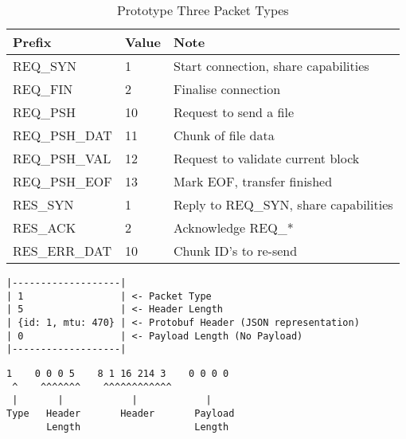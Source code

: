 \begin{table}[h!]
	\caption{Prototype Three Packet Types}
	\label{tab:p3d-packet-types}
	\centering
	\begin{tabular}{ l l l }
		\hline
		\textbf{Prefix} & \textbf{Value} & \textbf{Note}                        \\
		\hline
		REQ\_SYN         & 1              & Start connection, share capabilities \\
		\hline
		REQ\_FIN         & 2              & Finalise connection                  \\
		\hline
		REQ\_PSH         & 10             & Request to send a file               \\
		\hline
		REQ\_PSH\_DAT     & 11             & Chunk of file data                   \\
		\hline
		REQ\_PSH\_VAL     & 12             & Request to validate current block    \\
		\hline
		REQ\_PSH\_EOF     & 13             & Mark EOF, transfer finished          \\
		\hline
		RES\_SYN         & 1              & Reply to REQ\_SYN, share capabilities \\
		\hline
		RES\_ACK         & 2              & Acknowledge REQ\_*                    \\
		\hline
		RES\_ERR\_DAT     & 10             & Chunk ID's to re-send                \\
		\hline
	\end{tabular}
\end{table}

\begin{lstlisting}[float,caption={Prototype Three Example Packet Structure},label=lst:p3d-example-structure]
|-------------------|
| 1                 | <- Packet Type
| 5                 | <- Header Length
| {id: 1, mtu: 470} | <- Protobuf Header (JSON representation)
| 0                 | <- Payload Length (No Payload)
|-------------------|
\end{lstlisting}

\begin{lstlisting}[float,caption={Prototype Three Example Packet Binary},label=lst:p3d-example-binary]
 1    0 0 0 5    8 1 16 214 3    0 0 0 0
 ^    ^^^^^^^    ^^^^^^^^^^^^
 |       |            |            |
Type   Header       Header       Payload
       Length                    Length
\end{lstlisting}
